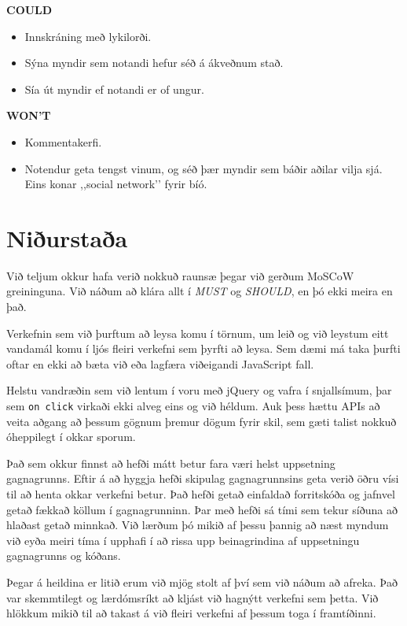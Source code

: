 \documentclass[a4paper,oneside]{article}
\begin{document}
\noindent\textbf{COULD}
\begin{itemize}
    \item Innskráning með lykilorði.
    \item Sýna myndir sem notandi hefur séð á ákveðnum stað.
    \item Sía út myndir ef notandi er of ungur.
\end{itemize}

\noindent\textbf{WON'T}
\begin{itemize}
    \item Kommentakerfi.
    \item Notendur geta tengst vinum, og séð þær myndir sem báðir aðilar vilja sjá.
        Eins konar ,,social network’’ fyrir bíó.
\end{itemize}

\section{Niðurstaða}
Við teljum okkur hafa verið nokkuð raunsæ þegar við gerðum MoSCoW greininguna. 
Við náðum að klára allt í \emph{MUST} og \emph{SHOULD}, en þó ekki meira en það. 

Verkefnin sem við þurftum að leysa komu í törnum, um leið og við leystum
eitt vandamál komu í ljós fleiri verkefni sem þyrfti að leysa.
Sem dæmi má taka þurfti oftar en ekki að bæta við eða lagfæra viðeigandi JavaScript fall.

Helstu vandræðin sem við lentum í voru með jQuery og vafra í snjallsímum, þar sem
\texttt{on click} virkaði ekki alveg eins og við héldum. Auk þess hættu APIs að 
veita aðgang að þessum gögnum þremur dögum fyrir skil, sem gæti talist nokkuð óheppilegt
í okkar sporum. 

Það sem okkur finnst að hefði mátt betur fara væri helst uppsetning gagnagrunns. Eftir á
að hyggja hefði skipulag gagnagrunnsins geta verið öðru vísi til að henta okkar verkefni 
betur. Það hefði getað einfaldað forritskóða og jafnvel getað fækkað köllum í gagnagrunninn.
Þar með hefði sá tími sem tekur síðuna að hlaðast getað minnkað. Við lærðum þó mikið af þessu 
þannig að næst myndum við eyða meiri tíma í upphafi í að rissa upp beinagrindina af uppsetningu 
gagnagrunns og kóðans.

Þegar á heildina er litið erum við mjög stolt af því sem við náðum að afreka. Það var skemmtilegt 
og lærdómsríkt að kljást við hagnýtt verkefni sem þetta. Við hlökkum mikið til að takast á við fleiri
verkefni af þessum toga í framtíðinni.
\end{document}
